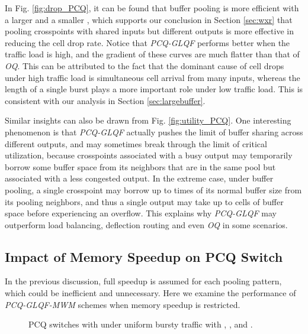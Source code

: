 \documentclass[journal,final,doublecolumn,10pt,twoside]{IEEEtranTCOM} \normalsize
\begin{document}
In Fig. \ref{fig:drop_PCQ}, it can be found that buffer pooling is more efficient with a larger  and a smaller , which supports our conclusion in Section \ref{sec:wxr} that pooling crosspoints with shared inputs but different outputs is more effective in reducing the cell drop rate. Notice that \emph{PCQ-GLQF} performs better when the traffic load is high, and the gradient of these curves are much flatter than that of \emph{OQ}. This can be attributed to the fact that the dominant cause of cell drops under high traffic load is simultaneous cell arrival from many inputs, whereas the length of a single burst plays a more important role under low traffic load. This is consistent with our analysis in Section \ref{sec:largebuffer}.

Similar insights can also be drawn from Fig. \ref{fig:utility_PCQ}. One interesting phenomenon is that \emph{PCQ-GLQF} actually pushes the limit of buffer sharing across different outputs, and may sometimes break through the limit of  critical utilization, because crosspoints associated with a busy output may temporarily borrow some buffer space from its neighbors that are in the same pool but associated with a less congested output. In the extreme case, under  buffer pooling, a single crosspoint may borrow up to  times of its normal buffer size  from its pooling neighbors, and thus a single output may take up to  cells of buffer space before experiencing an overflow. This explains why \emph{PCQ-GLQF} may outperform load balancing, deflection routing and even \emph{OQ} in some scenarios.

\subsection{Impact of Memory Speedup on PCQ Switch}

In the previous discussion, full speedup is assumed for each pooling pattern, which could be inefficient and unnecessary. Here we examine the performance of \emph{PCQ-GLQF-MWM} schemes when memory speedup is restricted.
\begin{figure}[ht]
\begin{minipage}[t]{3.2 in}
\centering {}
\end{minipage}
\begin{minipage}[t]{3.2 in}
\centering {}
\end{minipage}
\caption{ PCQ switches with  under uniform bursty traffic with , , and .}
\label{fig:speedup}
\end{figure}
\end{document}
